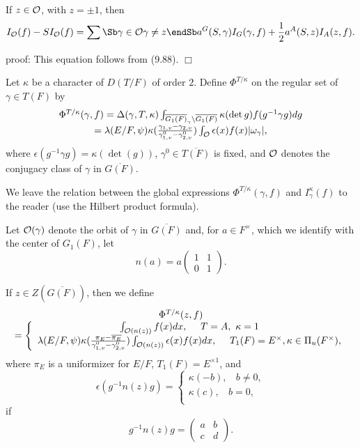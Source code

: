 \begin{lemma} If $z\in {\cal{O}}$, with $z=\pm 1$, then
\[
I_{\cal O}(f)-SI_{\cal O}(f)=
\sum\Sb \gamma\in {\cal{O}}\\\gamma\not= z\endSb
a^G(S,\gamma)I_G(\gamma,f)+
{1\over 2}a^A(S,z)I_A(z,f).
\]
\end{lemma}
proof: This equation follows from (9.88). $\Box$

\begin{definition}
Let $\kappa$ be a character of
$D(T/F)$ of order $2$.
Define $\Phi^{T/\kappa}$ on the regular set of $\gamma\in T(F)$ by
\[
\begin{array}{c}
\Phi^{T/\kappa}(\gamma,f)=
\Delta(\gamma,T,\kappa)
\int_{\overline{G_1(F)}_\gamma\backslash \overline{G_1(F)}}
\kappa(\det{g})f(g^{-1}\gamma g)dg\\
=
\lambda(E/F,\psi)
\kappa({\gamma_{1,v}-\gamma_{2,v}\over \gamma_{1,v}^0-\gamma_{2,v}^0})
\int_{\cal{O}}\epsilon(x)f(x)|\omega_\gamma|,
\end{array}
\]
where $\epsilon(g^{-1}\gamma g)=\kappa(\det(g))$,
$\gamma^0\in \overline{T(F)}$
is fixed, and $\cal{O}$ denotes the conjugacy class of
$\gamma$ in $\overline{G(F)}$.
\end{definition}

We leave the relation between the global expressions
$\Phi^{T/\kappa}(\gamma,f)$ and $I^\kappa_\gamma(f)$ to
the reader (use the Hilbert product formula).

Let ${\cal{O}}(\gamma)$ denote the orbit of
$\gamma$ in $\overline{G(F)}$ and,
for $a\in F^\times$, which we identify with the center of $G_1(F)$, let
\[
n(a)=a
\left(
\begin{array}{cc}
1&1\\ 0&1
\end{array}
\right).
\]

\begin{definition} If $z\in Z(\overline{G(F)})$, then we define
\[
\begin{array}{c}
\Phi^{T/\kappa}(z,f)\\
=
\left\{
\begin{array}{c}
\int_{{\cal{O}}(n(z))}
f(x)dx,\ \ \ \ T=A,\ \kappa =1\\
\lambda(E/F,\psi)
\kappa({\pi_E-\overline{\pi_E}\over \gamma_{1,v}^0-\gamma_{2,v}^0})
\int_{{\cal{O}}(n(z))}\epsilon(x)f(x)dx,\ \ \ \ T_1(F)=E^\times,
\kappa\in \Pi_u(F^\times),
\end{array}
\right.
\end{array}
\]
where $\pi_E$ is a uniformizer for $E/F$, $T_1(F)=E^{\times 1}$,
and
\[
\epsilon(g^{-1}n(z)g)=
\left\{
\begin{array}{c}
\kappa(-b),\ \ \ \ b\not= 0,\\
\kappa(c),\ \ \ \ b= 0,\\
\end{array}
\right.
\]
if
\[
g^{-1}n(z)g=
\left(
\begin{array}{cc}
a&b\\c&d
\end{array}
\right).
\]
\end{definition}

